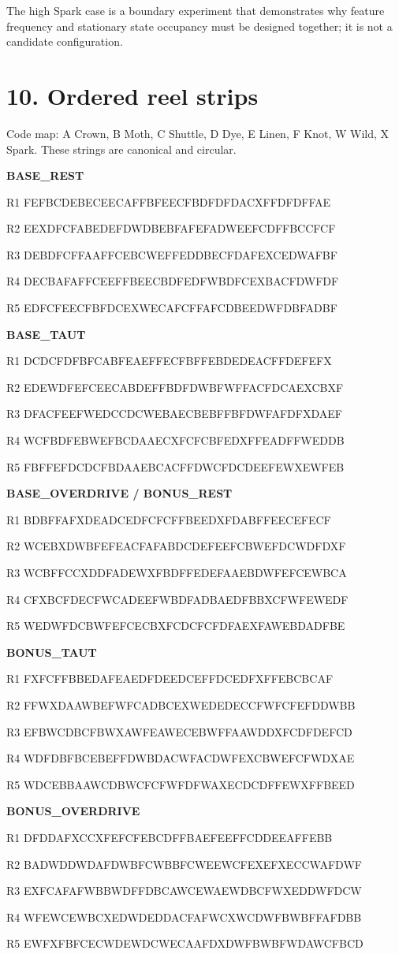 \documentclass[10pt]{article}
\newcommand{\sectionbar}[1]{\vspace{8pt}{\color{acid}\rule{\linewidth}{1.5pt}}\vspace{-5pt}\section*{#1}}
\begin{document}
The high Spark case is a boundary experiment that demonstrates why feature frequency and stationary state occupancy must be designed together; it is not a candidate configuration.

\sectionbar{10. Ordered reel strips}
Code map: A Crown, B Moth, C Shuttle, D Dye, E Linen, F Knot, W Wild, X Spark. These strings are canonical and circular.

\scriptsize\ttfamily
\textbf{BASE\_REST}\par
R1 FEFBCDEBECEECAFFBFEECFBDFDFDACXFFDFDFFAE\par
R2 EEXDFCFABEDEFDWDBEBFAFEFADWEEFCDFFBCCFCF\par
R3 DEBDFCFFAAFFCEBCWEFFEDDBECFDAFEXCEDWAFBF\par
R4 DECBAFAFFCEEFFBEECBDFEDFWBDFCEXBACFDWFDF\par
R5 EDFCFEECFBFDCEXWECAFCFFAFCDBEEDWFDBFADBF\par\medskip
\textbf{BASE\_TAUT}\par
R1 DCDCFDFBFCABFEAEFFECFBFFEBDEDEACFFDEFEFX\par
R2 EDEWDFEFCEECABDEFFBDFDWBFWFFACFDCAEXCBXF\par
R3 DFACFEEFWEDCCDCWEBAECBEBFFBFDWFAFDFXDAEF\par
R4 WCFBDFEBWEFBCDAAECXFCFCBFEDXFFEADFFWEDDB\par
R5 FBFFEFDCDCFBDAAEBCACFFDWCFDCDEEFEWXEWFEB\par\medskip
\textbf{BASE\_OVERDRIVE / BONUS\_REST}\par
R1 BDBFFAFXDEADCEDFCFCFFBEEDXFDABFFEECEFECF\par
R2 WCEBXDWBFEFEACFAFABDCDEFEEFCBWEFDCWDFDXF\par
R3 WCBFFCCXDDFADEWXFBDFFEDEFAAEBDWFEFCEWBCA\par
R4 CFXBCFDECFWCADEEFWBDFADBAEDFBBXCFWFEWEDF\par
R5 WEDWFDCBWFEFCECBXFCDCFCFDFAEXFAWEBDADFBE\par\medskip
\textbf{BONUS\_TAUT}\par
R1 FXFCFFBBEDAFEAEDFDEEDCEFFDCEDFXFFEBCBCAF\par
R2 FFWXDAAWBEFWFCADBCEXWEDEDECCFWFCFEFDDWBB\par
R3 EFBWCDBCFBWXAWFEAWECEBWFFAAWDDXFCDFDEFCD\par
R4 WDFDBFBCEBEFFDWBDACWFACDWFEXCBWEFCFWDXAE\par
R5 WDCEBBAAWCDBWCFCFWFDFWAXECDCDFFEWXFFBEED\par\medskip
\textbf{BONUS\_OVERDRIVE}\par
R1 DFDDAFXCCXFEFCFEBCDFFBAEFEEFFCDDEEAFFEBB\par
R2 BADWDDWDAFDWBFCWBBFCWEEWCFEXEFXECCWAFDWF\par
R3 EXFCAFAFWBBWDFFDBCAWCEWAEWDBCFWXEDDWFDCW\par
R4 WFEWCEWBCXEDWDEDDACFAFWCXWCDWFBWBFFAFDBB\par
R5 EWFXFBFCECWDEWDCWECAAFDXDWFBWBFWDAWCFBCD\par
\normalfont\normalsize
\end{document}
